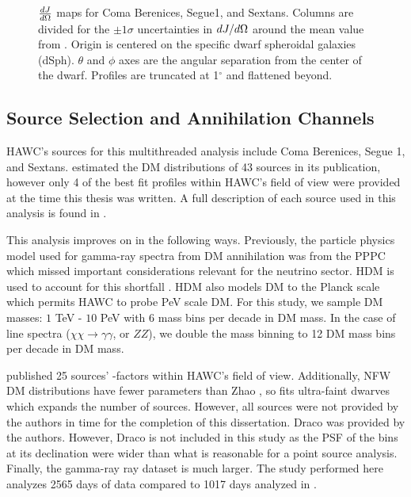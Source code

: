 \begin{figure}[t]
{\begin{tabular}{cccc}
    \end{tabular}
    }
    \caption{$\frac{dJ}{d\Omega}$ maps for Coma Berenices, Segue1, and Sextans. Columns are divided for the $\pm1 \sigma$ uncertainties in $dJ/d\Omega$ around the mean value from \LS \cite{DM_Strigari20}. Origin is centered on the specific dwarf spheroidal galaxies (dSph). $\theta$ and $\phi$ axes are the angular separation from the center of the dwarf. Profiles are truncated at 1$^\circ$ and flattened beyond.}
    \label{fig:ls20_jfac_maps}
\end{figure}

\subsection{Source Selection and Annihilation Channels}\label{sec:mtd_srcs_y_chan}

HAWC's sources for this multithreaded analysis include Coma Berenices, Segue 1, and Sextans.
\LS estimated the DM distributions of 43 sources in its publication, however only 4 of the best fit profiles within HAWC's field of view were provided at the time this thesis was written.
A full description of each source used in this analysis is found in .



This analysis improves on  in the following ways.
Previously, the particle physics model used for gamma-ray spectra from DM annihilation was from the PPPC \cite{Cirelli_2011} which missed important considerations relevant for the neutrino sector.
HDM is used to account for this shortfall \cite{HDMSpectra}.
HDM also models DM to the Planck scale which permits HAWC to probe PeV scale DM.
For this study, we sample DM masses: $1$ TeV - $10$ PeV with 6 mass bins per decade in DM mass.
In the case of line spectra ($\chi\chi \rightarrow \gamma\gamma$, or $ZZ$), we double the mass binning to 12 DM mass bins per decade in DM mass.

\LS published 25 sources' \J-factors within HAWC's field of view.
Additionally, NFW \cite{NFWProfile} DM distributions have fewer parameters than Zhao \cite{Zhao:1995cp}, so \LS fits ultra-faint dwarves which expands the number of sources.
However, all sources were not provided by the authors in time for the completion of this dissertation.
Draco was provided by the authors.
However, Draco is not included in this study as the PSF of the bins at its declination were wider than what is reasonable for a point source analysis.
Finally, the gamma-ray ray dataset is much larger.
The study performed here analyzes 2565 days of data compared to 1017 days analyzed in .

